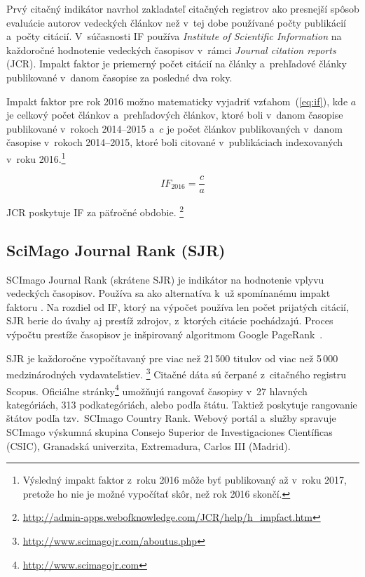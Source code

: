 Prvý citačný indikátor navrhol zakladateľ citačných registrov
\citet{Garfield1955} ako presnejší spôsob evaluácie autorov vedeckých článkov
než v~tej dobe používané počty publikácií a~počty citácií.  V~súčasnosti IF používa \emph{Institute of Scientific Information} na
každoročné hodnotenie vedeckých časopisov v~rámci \emph{Journal citation
  reports} (JCR).  Impakt faktor je priemerný počet citácií na články
a~prehľadové články publikované v~danom časopise za posledné dva roky.

Impakt faktor pre rok 2016 možno matematicky vyjadriť vzťahom~(\ref{eq:if}), kde
$a$ je celkový počet článkov a~prehľadových článkov, ktoré boli v~danom časopise
publikované v~rokoch 2014--2015 a~$c$ je počet článkov publikovaných v~danom
časopise v~rokoch 2014--2015, ktoré boli citované v~publikáciach indexovaných
v~roku 2016.\footnote{Výsledný impakt faktor z~roku 2016 môže byť publikovaný až
  v~roku 2017, pretože ho nie je možné vypočítať skôr, než rok 2016 skončí.}

\begin{equation}
\label{eq:if}
\mathit{IF}_{2016} = \frac{c}{a}
\end{equation}

\noindent JCR poskytuje IF za päťročné obdobie.%
\footnote{\url{http://admin-apps.webofknowledge.com/JCR/help/h_impfact.htm}}

\subsection{SciMago Journal Rank (SJR)}
\label{sec:sjr}

SCImago Journal Rank (skrátene SJR) je indikátor na hodnotenie vplyvu vedeckých
časopisov.  Používa sa ako alternatíva k~už spomínanému impakt faktoru
\citep{Falagas2008}.  Na rozdiel od IF, ktorý na výpočet používa len počet
prijatých citácií, SJR berie do úvahy aj prestíž zdrojov, z~ktorých citácie
pochádzajú.  Proces výpočtu prestíže časopisov \citep{GuerreroBote2012} je
inšpirovaný algoritmom Google PageRank\texttrademark\ \citep{Page1999}.

SJR je každoročne vypočítavaný pre viac než 21\,500 titulov od viac než 5\,000
medzinárodných vydavateľstiev.%
\footnote{\url{http://www.scimagojr.com/aboutus.php}} Citačné
dáta sú čerpané z~citačného registru Scopus\R.
Oficiálne stránky\footnote{\url{http://www.scimagojr.com}} umožňujú rangovať
časopisy v~27 hlavných kategóriách, 313 podkategóriách, alebo podľa štátu.
Taktiež poskytuje rangovanie štátov podľa tzv.~SCImago Country Rank.  Webový
portál a~služby spravuje SCImago výskumná skupina Consejo Superior de
Investigaciones Científicas (CSIC), Granadská univerzita, Extremadura, Carlos
III (Madrid).


